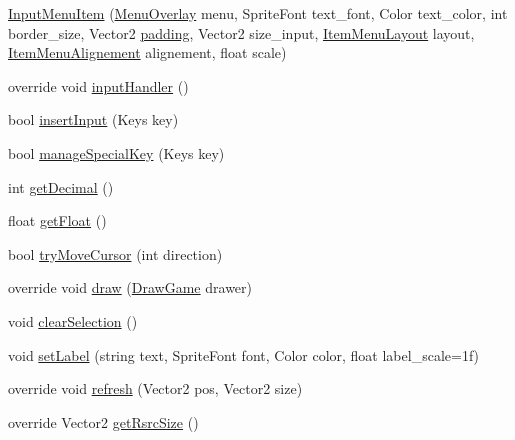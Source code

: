 \begin{DoxyCompactItemize}
\item 
\hyperlink{classgearit_1_1src_1_1utility_1_1_menu_1_1_input_menu_item_a12e8a349ec1cf7369d7ca9988064872b}{Input\+Menu\+Item} (\hyperlink{classgearit_1_1src_1_1utility_1_1_menu_1_1_menu_overlay}{Menu\+Overlay} menu, Sprite\+Font text\+\_\+font, Color text\+\_\+color, int border\+\_\+size, Vector2 \hyperlink{classgearit_1_1src_1_1utility_1_1_menu_1_1_menu_item_ae2a8172ef48a64fbb99dfca22e9995ab}{padding}, Vector2 size\+\_\+input, \hyperlink{namespacegearit_1_1src_1_1utility_1_1_menu_a3ca3e98c7e2f44227e0fd6263822c56a}{Item\+Menu\+Layout} layout, \hyperlink{namespacegearit_1_1src_1_1utility_1_1_menu_a4312fcb06a1685782d1246bfeefdbd3b}{Item\+Menu\+Alignement} alignement, float scale)
\item 
override void \hyperlink{classgearit_1_1src_1_1utility_1_1_menu_1_1_input_menu_item_a9bfb226dde0ead28d15b168e095e4a0e}{input\+Handler} ()
\item 
bool \hyperlink{classgearit_1_1src_1_1utility_1_1_menu_1_1_input_menu_item_a31a78d99fee84f6826593a11677a6c0f}{insert\+Input} (Keys key)
\item 
bool \hyperlink{classgearit_1_1src_1_1utility_1_1_menu_1_1_input_menu_item_a70d5cb006bd94d86b6f8ac190c13f605}{manage\+Special\+Key} (Keys key)
\item 
int \hyperlink{classgearit_1_1src_1_1utility_1_1_menu_1_1_input_menu_item_a6503f8508b3358cc066576af9972510f}{get\+Decimal} ()
\item 
float \hyperlink{classgearit_1_1src_1_1utility_1_1_menu_1_1_input_menu_item_aba166d65bda80f2a9371a64472272ed7}{get\+Float} ()
\item 
bool \hyperlink{classgearit_1_1src_1_1utility_1_1_menu_1_1_input_menu_item_a623b7b6c14b305ef10960e4cd47a9a85}{try\+Move\+Cursor} (int direction)
\item 
override void \hyperlink{classgearit_1_1src_1_1utility_1_1_menu_1_1_input_menu_item_a1f92434580e2820a2b8953671ca1ba0e}{draw} (\hyperlink{classgearit_1_1src_1_1_draw_game}{Draw\+Game} drawer)
\item 
void \hyperlink{classgearit_1_1src_1_1utility_1_1_menu_1_1_input_menu_item_a789c52c5a431f3371924a9a6221ea9d1}{clear\+Selection} ()
\item 
void \hyperlink{classgearit_1_1src_1_1utility_1_1_menu_1_1_input_menu_item_a870c3551aeca3cc8be787620060f1817}{set\+Label} (string text, Sprite\+Font font, Color color, float label\+\_\+scale=1f)
\item 
override void \hyperlink{classgearit_1_1src_1_1utility_1_1_menu_1_1_input_menu_item_a8971f0c240729bc1d79c92b5424981df}{refresh} (Vector2 pos, Vector2 size)
\item 
override Vector2 \hyperlink{classgearit_1_1src_1_1utility_1_1_menu_1_1_input_menu_item_af3b6d354cb490ff74b5fd1517ba19f0b}{get\+Rsrc\+Size} ()
\end{DoxyCompactItemize}

